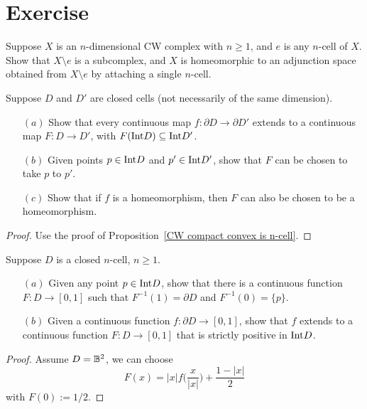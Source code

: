 \section{Exercise}
\begin{exercise}\label{CW minus n-cell}
Suppose $X$ is an $n$-dimensional CW complex with $n\geq 1$, and $e$ is any $n$-cell of $X$. Show that $X\setminus e$ is a subcomplex, and $X$ is homeomorphic to an adjunction space obtained from $X\setminus e$ by attaching a single $n$-cell.
\end{exercise}
\begin{exercise}\label{extension maps on boundary of cell}
Suppose $D$ and $D'$ are closed cells (not necessarily of the same dimension).
\begin{itemize}
\item[$(a)$] Show that every continuous map $f:\partial D\to\partial D'$ extends to a continuous map $F:D\to D'$, with $F(\mathrm{Int} D)\subseteq\mathrm{Int} D'$.
\item[$(b)$] Given points $p\in\mathrm{Int} D$ and $p'\in\mathrm{Int} D'$, show that $F$ can be chosen to
take $p$ to $p'$.
\item[$(c)$] Show that if $f$ is a homeomorphism, then $F$ can also be chosen to be a homeomorphism.
\end{itemize}
\end{exercise}
\begin{proof}
Use the proof of Proposition~\ref{CW compact convex is n-cell}.
\end{proof}
\begin{exercise}\label{closed cell exercise}
Suppose $D$ is a closed $n$-cell, $n\geq1$.
\begin{itemize}
\item[$(a)$] Given any point $p\in\mathrm{Int} D$, show that there is a continuous function
$F:D\to[0,1]$ such that $F^{-1}(1)=\partial D$ and $F^{-1}(0)=\{p\}$.
\item[$(b)$] Given a continuous function $f:\partial D\to[0,1]$, show that $f$ extends to a continuous function $F:D\to[0,1]$ that is strictly positive in $\mathrm{Int} D$.
\end{itemize}
\end{exercise}
\begin{proof}
Assume $D=\mathbb{B}^2$, we can choose
\[F(x)=|x|f\Big(\dfrac{x}{|x|}\Big)+\dfrac{1-|x|}{2}\]
with $F(0):=1/2$.
\end{proof}
